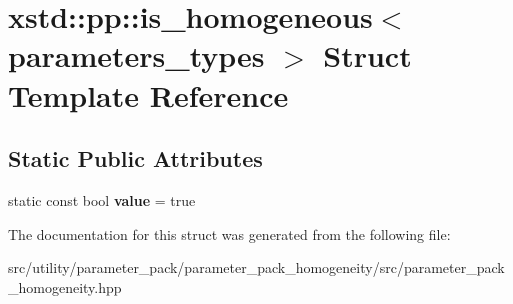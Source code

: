 \hypertarget{structxstd_1_1pp_1_1is__homogeneous}{\section{xstd\-:\-:pp\-:\-:is\-\_\-homogeneous$<$ parameters\-\_\-types $>$ Struct Template Reference}
\label{structxstd_1_1pp_1_1is__homogeneous}
}
\subsection*{Static Public Attributes}
\begin{DoxyCompactItemize}
\item 
\hypertarget{structxstd_1_1pp_1_1is__homogeneous_a104d1888e8f39e2d57ab27c7c3fb7383}{static const bool {\bfseries value} = true}\label{structxstd_1_1pp_1_1is__homogeneous_a104d1888e8f39e2d57ab27c7c3fb7383}

\end{DoxyCompactItemize}


The documentation for this struct was generated from the following file\-:\begin{DoxyCompactItemize}
\item 
src/utility/parameter\-\_\-pack/parameter\-\_\-pack\-\_\-homogeneity/src/parameter\-\_\-pack\-\_\-homogeneity.\-hpp\end{DoxyCompactItemize}
